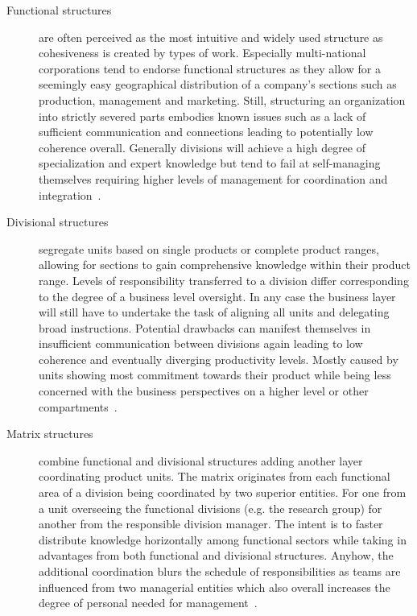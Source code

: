 \begin{description}
  \item[Functional structures] are often perceived as the most
intuitive and widely used structure as cohesiveness is created by types of work. Especially multi-national corporations tend to endorse functional structures as they allow for a seemingly easy geographical distribution of a company's sections such as production, management and marketing. Still, structuring an organization into strictly severed parts embodies known issues such as a lack of sufficient communication and connections leading to potentially low coherence overall. Generally divisions will achieve a high degree of specialization and expert knowledge but tend to fail at self-managing themselves requiring higher levels of management for coordination and integration~\citep{price2007hrm}.
  \item[Divisional structures]
segregate units based on single products or complete product ranges, allowing for sections to gain comprehensive knowledge within their product range. Levels of responsibility transferred to a division differ corresponding to the degree of a business level oversight. In any case the business layer will still have to undertake the task of aligning all units and delegating broad instructions. Potential drawbacks can manifest themselves in insufficient communication between divisions again leading to low coherence and eventually diverging productivity levels. Mostly caused by units showing most commitment towards their product while being less concerned with the business perspectives on a higher level or other compartments~\citep{price2007hrm}.
  \item[Matrix structures]
combine functional and divisional structures adding another layer coordinating product units. The matrix originates from each functional area of a division being coordinated by two superior entities. For one from a unit overseeing the functional divisions (e.g. the research group) for another from the responsible division manager. The intent is to faster distribute knowledge horizontally among functional sectors while taking in advantages from both functional and divisional structures. Anyhow, the additional coordination blurs the schedule of responsibilities as teams are influenced from two managerial entities which also overall increases the degree of personal needed for management~\citep{galbraith2008matrix}.
\end{description}


